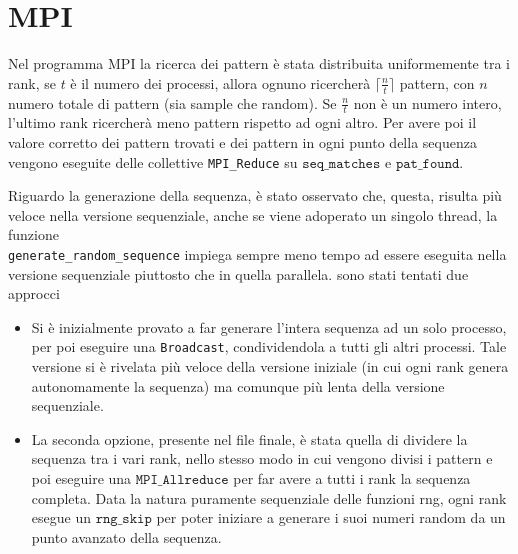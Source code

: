 \documentclass[12pt,openany]{report}
\begin{document}
\newpage
\section{MPI}
Nel programma MPI la ricerca dei pattern è stata distribuita uniformemente tra i rank, se $t$ è il numero dei processi, allora ognuno ricercherà $\lceil \frac{n}{t}\rceil$ pattern, con $n$ numero totale di pattern (sia sample che random). Se $\frac{n}{t}$ non è un numero intero, l'ultimo rank ricercherà meno pattern rispetto ad ogni altro. Per avere poi il valore corretto dei pattern trovati e dei pattern in ogni punto della sequenza vengono eseguite delle collettive \texttt{MPI\_Reduce} su $\texttt{seq\_matches}$ e $\texttt{pat\_found}$.

\bigskip 
Riguardo la generazione della sequenza,
è stato osservato che, questa, risulta  più veloce nella versione sequenziale, anche se viene adoperato un singolo thread, la funzione\\ \texttt{generate\_random\_sequence} impiega sempre meno tempo ad essere eseguita nella versione sequenziale piuttosto che in quella parallela.
sono stati tentati due approcci\begin{itemize}
    \item 
Si è inizialmente provato a far generare l'intera sequenza ad un solo processo, per poi eseguire una \texttt{Broadcast}, condividendola a tutti gli altri processi. Tale versione si è rivelata più veloce della versione iniziale (in cui ogni rank genera autonomamente la sequenza) ma comunque più lenta della versione sequenziale.
\item  La seconda opzione, presente nel file finale, è stata quella di dividere la sequenza tra i vari rank, nello stesso modo in cui vengono divisi i pattern e poi eseguire una $\texttt{MPI\_Allreduce}$ per far avere a tutti i rank la sequenza completa. Data la natura puramente sequenziale delle funzioni rng, ogni rank esegue un $\texttt{rng\_skip}$ per poter iniziare a generare i suoi numeri random da un punto avanzato della sequenza.\end{itemize}
\end{document}
